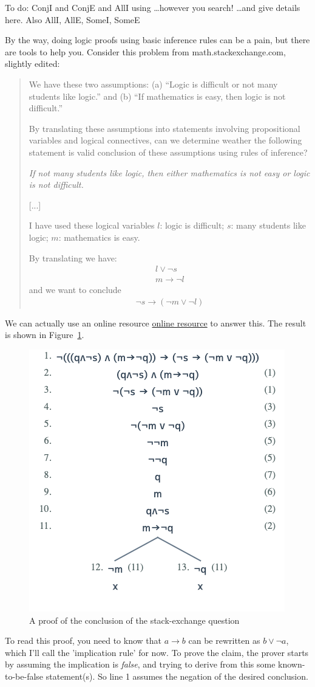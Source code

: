 To do: ConjI and ConjE and AllI using \ldots however you search! \ldots  and give details here. Also AllI, AllE, SomeI, SomeE

By the way, doing logic proofs using basic inference rules can be a pain, but there are tools to help you. Consider this problem from math.stackexchange.com, slightly edited:


\begin{quote}   
We have these two assumptions: (a) “Logic is difficult or not many students like logic.” and (b) “If mathematics is easy, then logic is not difficult.”

By translating these assumptions into statements involving propositional variables and logical connectives, can we determine weather the following statement is valid conclusion of these assumptions using rules of inference?

\emph{If not many students like logic, then either mathematics is not easy or logic is not difficult.}

[...]

I have used these logical variables
$l$: logic is difficult; $s$: many students like logic; 
$m$: mathematics is easy.

By translating we have:
\begin{align}
l \vee \neg s \\
m \to \neg l
\end{align}
and we want to conclude 
\begin{align}
\neg s \to (\neg m \vee \neg l)
\end{align}
\end{quote}
We can actually use an online resource \href{https://www.umsu.de/trees/#(q~1(~3s))~1(m~5(~3q))~5((~3s)~5((~3m)~2(~3q)))}{online resource} to answer this. The result is shown in Figure~\ref{fig:logic-proof}.

\begin{figure}[ht]
    \centering
    \includegraphics[width=0.5\linewidth]{C03//Images/logic-proof.png}
    \caption{A proof of the conclusion of the stack-exchange question}
    \label{fig:logic-proof}
\end{figure}
To read this proof, you need to know that $a \to b$ can be rewritten as $b \vee \neg a$, which I'll call the 'implication rule' for now. To prove the claim, the prover starts by assuming the implication is \textit{false}, and trying to derive from this some known-to-be-false statement(s). So line 1 assumes the negation of the desired conclusion. 

